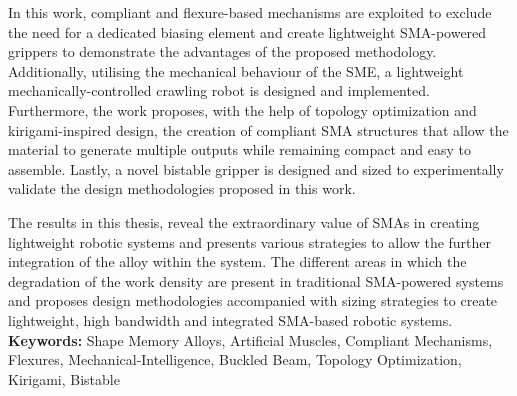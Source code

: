 In this work, compliant and flexure-based mechanisms are exploited to exclude the need for a dedicated biasing element and create lightweight SMA-powered grippers to demonstrate the advantages of the proposed methodology. Additionally, utilising the mechanical behaviour of the SME, a lightweight mechanically-controlled crawling robot is designed and implemented. Furthermore, the work proposes, with the help of topology optimization and kirigami-inspired design, the creation of compliant SMA structures that allow the material to generate multiple outputs while remaining compact and easy to assemble. Lastly, a novel bistable gripper is designed and sized to experimentally validate the design methodologies proposed in this work.

The results in this thesis, reveal the extraordinary value of SMAs in creating lightweight robotic systems and presents various strategies to allow the further integration of the alloy within the system. The different areas in which the degradation of the work density are present in traditional SMA-powered systems and proposes design methodologies accompanied with sizing strategies to create lightweight, high bandwidth and integrated SMA-based robotic systems.\\

\textbf{Keywords:} Shape Memory Alloys, Artificial Muscles, Compliant Mechanisms, Flexures, Mechanical-Intelligence, Buckled Beam, Topology Optimization, Kirigami, Bistable

